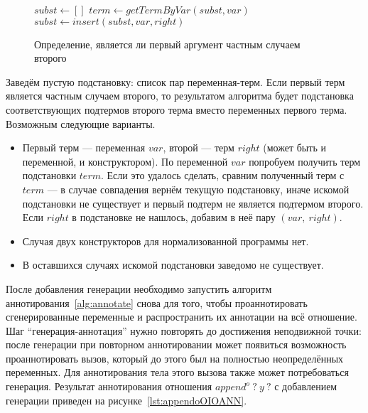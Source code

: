 \begin{figure}[h!]
  \begin{center}
  \begin{minipage}{\textwidth}
\begin{algorithm}[H]
  \begin{algorithmic}
      \State $subst \gets []$
          \State $term \gets getTermByVar(subst, var)$
               \EndReturn
            \EndIf
          \Else
            \State $subst \gets insert(subst, var, right)$
          \EndIf
           \EndReturn
        \EndCase
        \Otherwise
           \EndReturn
        \EndOtherwise
      \EndSwitch
    \EndFunction
  \end{algorithmic}
\end{algorithm}
  \end{minipage}
  \end{center}
  \caption{Определение, является ли первый аргумент частным случаем второго}
  \label{alg:isSubsetOf}
\end{figure}

Заведём пустую подстановку: список пар переменная-терм.
Если первый терм является частным случаем второго, то результатом алгоритма будет подстановка соответствующих подтермов второго терма вместо переменных первого терма.
Возможным следующие варианты.
\begin{itemize}
    \item Первый терм --- переменная $var$, второй --- терм $right$ (может быть и переменной, и конструктором).
    По переменной $var$ попробуем получить терм подстановки $term$.
    Если это удалось сделать, сравним полученный терм с $term$ --- в случае совпадения вернём текущую подстановку, иначе искомой подстановки не существует и первый подтерм не является подтермом второго.
    Если $right$ в подстановке не нашлось, добавим в неё пару $(var,~right)$.
    \item Случая двух конструкторов для нормализованной программы нет.
    \item В оставшихся случаях искомой подстановки заведомо не существует.
\end{itemize}

После добавления генерации необходимо запустить алгоритм аннотирования~\ref{alg:annotate} снова для того, чтобы проаннотировать сгенерированные переменные и распространить их аннотации на всё отношение.
Шаг ``генерация-аннотация'' нужно повторять до достижения неподвижной точки: после генерации при повторном аннотировании может появиться возможность проаннотировать вызов, который до этого был на полностью неопределённых переменных.
Для аннотирования тела этого вызова также может потребоваться генерация.
Результат аннотирования отношения $append^o \ ? \ y \ ?$ с добавлением генерации приведен на рисунке~\ref{lst:appendoOIOANN}.

